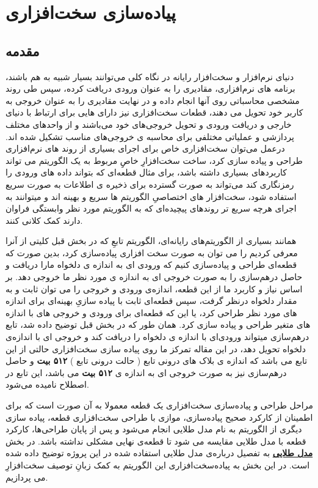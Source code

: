 \chapter{
	پیاده‌سازی سخت‌افزاری 
}

\section{
	مقدمه
}

دنیای نرم‌افزار و سخت‌افزار رایانه در نگاه کلی می‌توانند بسیار شبیه به هم باشند، برنامه های نرم‌افزاری، مقادیری را به عنوان ورودی دریافت کرده، سپس طی روند مشخصی محاسباتی روی آنها انجام داده و در نهایت مقادیری را به عنوان خروجی به کاربر خود تحویل می دهند، قطعات سخت‌افزاری نیز دارای 
هایی برای ارتباط با دنیای خارجی و دریافت ورودی‌ و تحویل خروجی‌های خود می‌باشند و از واحدهای مختلف پردازشی و عملیاتی مختلفی برای محاسبه ی خروجی‌های مناسب تشکیل شده اند. درعمل می‌توان سخت‌افزاری خاص برای اجرای بسیاری از روند های نرم‌افزاری طراحی و پیاده سازی کرد، ساخت سخت‌افزارِ خاصِِ مربوط به یک الگوریتم می تواند کاربرد‌های بسیاری داشته باشد، برای مثال قطعه‌ای که بتواند داده های ورودی را رمزنگاری کند می‌تواند به صورت گسترده برای ذخیره ی اطلاعات به صورت سریع استفاده شود، سخت‌افزار های اختصاصیِ الگوریتم ها سریع و بهینه اند و میتوانند به اجرای هرچه سریع تر روندهای پیچیده‌ای که به الگوریتم مورد نظر وابستگی فراوان دارند کمک کلانی کنند.

همانند بسیاری از الگوریتم‌های رایانه‌ای، الگوریتم تابعِ 
که در بخش قبل کلیتی از آنرا معرفی کردیم را می توان به صورت سخت افزاری پیاده‌سازی کرد، بدین صورت که قطعه‌ای طراحی و پیاده‌سازی کنیم که ورودی ای به اندازه ی دلخواه مارا دریافت و حاصل درهم‌سازی را به صورت خروجی ای به اندازه ی مورد نظر ما خروجی دهد. بر اساس نیاز و کاربرد ما از این قطعه، اندازه‌ی ورودی و خروجی را می توان ثابت و به مقدار دلخواه درنظر گرفت، سپس قطعه‌ای ثابت با پیاده سازیِ بهینه‌ای برای اندازه های مورد نظر طراحی کرد، یا این که قطعه‌ای  برای ورودی و خروجی های با اندازه های متغیر طراحی و پیاده سازی کرد. همان طور که در بخش قبل توضیح داده شد، تابع درهم‌سازی 
میتواند ورودی‌ای با اندازه ی دلخواه را دریافت کند و خروجی ای با اندازه‌ی دلخواه تحویل دهد، در این مقاله تمرکز ما روی پیاده سازی سخت‌افزاری حالتی از این تابع می باشد که اندازه ی بلاک های درونی تابع ( حالت درونی تابع ) 
\textbf{۵۱۲ بیت}
و حاصل درهم‌سازی نیز به صورت خروجی ای به اندازه ی 
\textbf{۵۱۲ بیت}
می باشد، این تابع در اصطلاح 
نامیده می‌شود.

مراحل طراحی و پیاده‌سازی سخت‌افزاری یک قطعه معمولا به آن صورت است که برای اطمینان از کارکرد صحیح پیاده‌سازی، موازی با طراحی سخت‌افزاری قطعه، پیاده سازی دیگری از الگوریتم به نام مدل طلایی انجام می‌شود و پس از پایان طراحی‌ها، کارکرد قطعه با مدل طلایی مقایسه می شود تا قطعه‌ی نهایی مشکلی نداشته باشد. در بخش 
\hyperref[chapter:GoldenModel]{\textbf{مدل طلایی}}
به تفصیل درباره‌ی مدل طلایی استفاده شده در این پروژه توضیح داده شده است. در این بخش به پیاده‌سخت‌افزاری این الگوریتم به کمک زبانِ توصیف سخت‌افزارِ 
می پردازیم.

